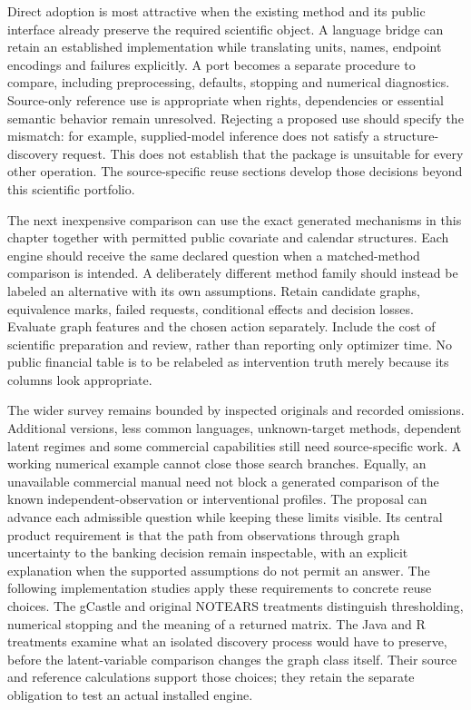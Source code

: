 Direct adoption is most attractive when the existing method and its public
interface already preserve the required scientific object. A language bridge
can retain an established implementation while translating units, names,
endpoint encodings and failures explicitly. A port becomes a separate
procedure to compare, including preprocessing, defaults, stopping and numerical
diagnostics. Source-only reference use is appropriate when rights, dependencies
or essential semantic behavior remain unresolved. Rejecting a proposed use
should specify the mismatch: for example, supplied-model inference does not
satisfy a structure-discovery request. This does not establish that the package
is unsuitable for every other operation. The source-specific reuse sections
develop those decisions beyond this scientific portfolio.

The next inexpensive comparison can use the exact generated mechanisms in
this chapter together with permitted public covariate and calendar structures.
Each engine should receive the same declared question when a matched-method
comparison is intended. A deliberately different method family should instead
be labeled an alternative with its own assumptions. Retain candidate graphs,
equivalence marks, failed requests, conditional effects and decision losses.
Evaluate graph features and the chosen action separately. Include the cost of
scientific preparation and review, rather than reporting only optimizer time.
No public financial table is to be relabeled as intervention truth merely
because its columns look appropriate. \citep{exec16_s2_design}

The wider survey remains bounded by inspected originals and recorded
omissions. Additional versions, less common languages, unknown-target methods,
dependent latent regimes and some commercial capabilities still need
source-specific work. A working numerical example cannot close those search
branches. Equally, an unavailable commercial manual need not block a generated
comparison of the known independent-observation or interventional profiles.
The proposal can advance each admissible question while keeping these limits
visible. Its central product requirement is that the path from observations
through graph uncertainty to the banking decision remain inspectable, with
an explicit explanation when the supported assumptions do not permit an
answer. \citep{exec16_s2_design}
The following implementation studies apply these requirements to concrete
reuse choices. The gCastle and original NOTEARS treatments distinguish
thresholding, numerical stopping and the meaning of a returned matrix.
The Java and R treatments examine what an isolated discovery process would
have to preserve, before the latent-variable comparison changes the graph
class itself. Their source and reference calculations support those choices;
they retain the separate obligation to test an actual installed engine.
\label{exec16:s2-end}


